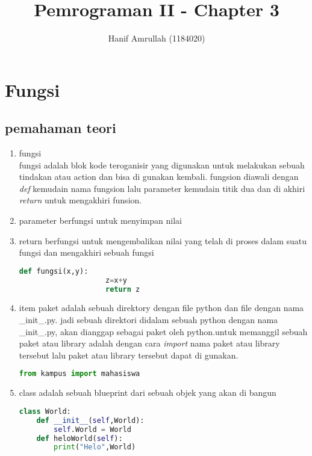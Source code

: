 \documentclass[12pt]{article}
\begin{document}
\title{Pemrograman II - Chapter 3}
\author{Hanif Amrullah (1184020)}
\date{}
\maketitle

\section{Fungsi}
	\subsection{pemahaman teori}
		\begin{enumerate}
			\item fungsi\\
			fungsi adalah blok kode teroganisir yang digunakan untuk melakukan sebuah tindakan atau action dan bisa di gunakan kembali. fungsion diawali dengan \textit{def} kemudain nama fungsion lalu parameter kemudain titik dua dan di akhiri \textit{return} untuk mengakhiri funsion.\\
			
			\item parameter berfungsi untuk menyimpan nilai
			
			\item return berfungsi untuk mengembalikan nilai yang telah di proses dalam suatu fungsi dan mengakhiri sebuah fungsi
			\begin{lstlisting}[language=Python]
			def fungsi(x,y):
					z=x+y
					return z
			\end{lstlisting}
			
			\item item paket adalah sebuah direktory dengan file python dan file dengan nama \_init\_.py. jadi sebuah direktori didalam sebuah python dengan nama \_init\_.py, akan dianggap sebagai paket oleh python.untuk memanggil sebuah paket atau library adalah dengan cara \textit{import} nama paket atau library tersebut lalu paket atau library tersebut dapat di gunakan.
			\begin{lstlisting}[language=Python]
			from kampus import mahasiswa
			\end{lstlisting}
			
			\item class adalah sebuah blueprint dari sebuah objek yang akan di bangun
			\begin{lstlisting}[language=Python]
class World:
    def __init__(self,World):
        self.World = World
    def heloWorld(self):
        print("Helo",World)
			\end{lstlisting}
			

\end{enumerate}
\end{document}
